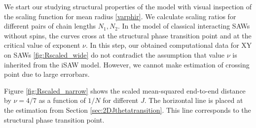 We start our studying structural properties of the model with visual inspection of the scaling function for mean radius \eqref{varphir}. We calculate scaling ratios for different pairs of chain lengths $N_1,N_2$. In the model of classical interacting SAWs without spins, the curves cross at the structural phase transition point and at the critical value of exponent $\nu$. In this step, our obtained computational data for XY on SAWs \ref{fig:Rscaled_wide} do not contradict the assumption that value $\nu$ is inherited from the iSAW model. However, we cannot make estimation of crossing point due to large errorbars. 

Figure \ref{fig:Rscaled_narrow} shows the scaled
mean-squared end-to-end distance by $\nu=4/7$ as a function of 
$1/N$ for different $J$. The horizontal line is placed at the estimation from Section \ref{sec:2DJthetatransition}. This line corresponds to the structural phase transition point.

